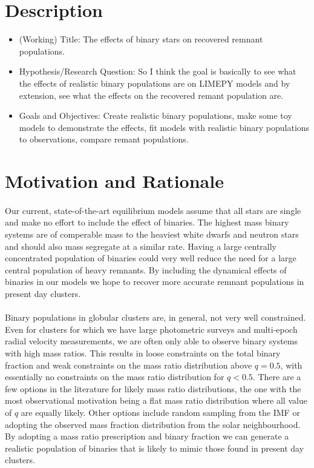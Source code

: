\documentclass[12pt,letterpaper]{article}
\newcommand{\software}[1]{\textrm{\MakeUppercase{#1}}}
\begin{document}
\section{Description}
\begin{itemize}
	\item (Working) Title: The effects of binary stars on recovered remnant populations.
	\item Hypothesis/Research Question: So I think the goal is basically to see what the effects
	      of realistic binary populations are on \software{limepy} models and by extension, see
	      what the effects on the recovered remant population are.
	\item Goals and Objectives: Create realistic binary populations, make some toy models to
	      demonstrate the effects, fit models with realistic binary populations to observations,
	      compare remant populations.
\end{itemize}

\section{Motivation and Rationale}
\paragraph{}
Our current, state-of-the-art equilibrium models assume that all stars are single and make no effort
to include the effect of binaries. The highest mass binary systems are of comperable mass to the
heaviest white dwarfs and neutron stars and should also mass segregate at a similar rate. Having a
large centrally concentrated population of binaries could very well reduce the need for a large
central population of heavy remnants. By including the dynamical effects of binaries in our models
we hope to recover more accurate remnant populations in present day clusters.


\paragraph{}
Binary populations in globular clusters are, in general, not very well constrained. Even for
clusters for which we have large photometric surveys and multi-epoch radial velocity measurements,
we are often only able to observe binary systems with high mass ratios. This results in loose
constraints on the total binary fraction and weak constraints on the mass ratio distribution above $
q = 0.5$, with essentially no constraints on the mass ratio distribution for $q < 0.5$. There are a
few options in the literature for likely mass ratio distributions, the one with the most
observational motivation being a flat mass ratio distribution where all value of $q$ are equally
likely. Other options include random sampling from the IMF or adopting the observed mass fraction
distribution from the solar neighbourhood. By adopting a mass ratio prescription and binary fraction
we can generate a realistic population of binaries that is likely to mimic those found in present
day clusters.
\end{document}
